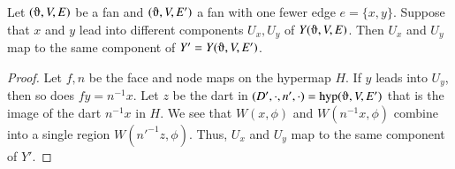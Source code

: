 %
%

\begin{lemma} 
Let $(\orgn,V,E)$ be a fan and $(\orgn,V,E')$
a fan with one fewer edge $e = \{x,y\}$.  
Suppose that $x$ and $y$ lead into different components $U_x,U_y$
of $Y(\orgn,V,E)$.
Then $U_x$ and $U_y$ map to the same component of $Y'=Y(\orgn,V,E')$.
\end{lemma}

\begin{proof}
Let $f,n$ be the face and node maps on the hypermap
$H$.
If $y$ leads into $U_y$, then so does
$f y = n^{-1} x$.  Let $z$ be the dart in
$(D',\cdot,n',\cdot)=\op{hyp}(\orgn,V,E')$ that is the image of the dart $n^{-1}x$
in $H$. We see that
$W(x,\phi)$ and $W(n^{-1} x,\phi)$ combine into a single
region $W({n'}^{-1}z,\phi)$.  Thus, $U_x$ and $U_y$ map to the
same component of $Y'$.
\end{proof}

%


